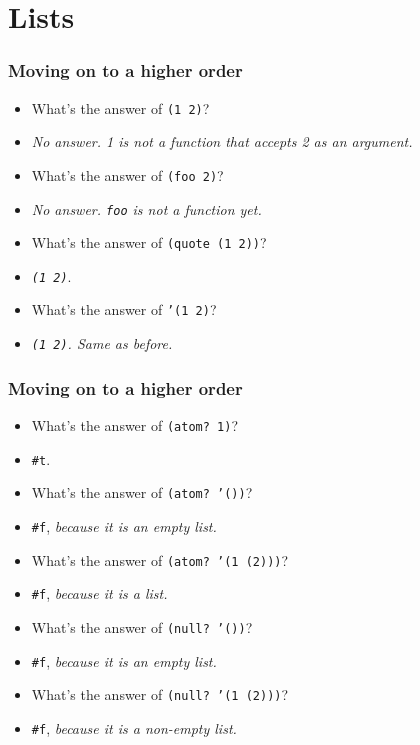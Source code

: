 \section{Lists}

\begin{frame}[fragile]
  \frametitle{Moving on to a higher order}
  \begin{itemize}
    \item What's the answer of \texttt{(1 2)}?
    \pause
    \item \emph{No answer. 1 is not a function that accepts 2 as an argument.}
    \pause
    \item What's the answer of \texttt{(foo 2)}?
    \pause
    \item \emph{No answer. \texttt{foo} is not a function yet.}
    \pause
    \item What's the answer of \texttt{(quote (1 2))}?
    \pause
    \item \emph{\texttt{(1 2)}}.
    \pause
    \item What's the answer of \texttt{'(1 2)}?
    \pause
    \item \emph{\texttt{(1 2)}. Same as before.}
  \end{itemize}
\end{frame}

\begin{frame}[fragile]
    \frametitle{Moving on to a higher order}
    \begin{itemize}
      \item What's the answer of \texttt{(atom? 1)}?
      \item \texttt{#t}.
      \pause
      \item What's the answer of \texttt{(atom? '())}?
      \item \texttt{#f}, \emph{because it is an empty list.}
      \pause
      \item What's the answer of \texttt{(atom? '(1 (2)))}?
      \item \texttt{#f}, \emph{because it is a list.}
      \pause
      \item What's the answer of \texttt{(null? '())}?
      \item \texttt{#f}, \emph{because it is an empty list.}
      \pause
      \item What's the answer of \texttt{(null? '(1 (2)))}?
      \item \texttt{#f}, \emph{because it is a non-empty list.}
    \end{itemize}
\end{frame}

